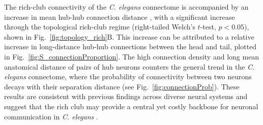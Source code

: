 \documentclass[10pt,letterpaper]{article}
\begin{document}
The rich-club connectivity of the \emph{C. elegans} connectome is accompanied by an increase in mean hub-hub connection distance \cite{Towlson2013}, with a significant increase through the topological rich-club regime (right-tailed Welch's $t$-test, $p < 0.05$), shown in Fig.~\ref{fig:topology_rich}B.
This increase can be attributed to a relative increase in long-distance hub-hub connections between the head and tail, plotted in Fig.~\ref{fig:S_connectionProportion}.
The high connection density and long mean anatomical distance of pairs of hub neurons counters the general trend in the \emph{C. elegans} connectome, where the probability of connectivity between two neurons decays with their separation distance (see Fig.~\ref{fig:connectionProb}).
These results are consistent with previous findings across diverse neural systems and suggest that the rich club may provide a central yet costly backbone for neuronal communication in \emph{C. elegans} \cite{vandenHeuvel:2012kh}.

\end{document}
